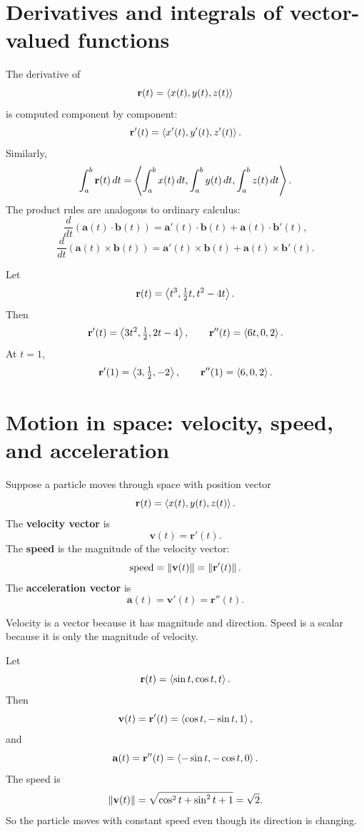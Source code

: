\section{Derivatives and integrals of vector-valued functions}

The derivative of
\[
\mathbf r(t)=\left\langle x(t),y(t),z(t)\right\rangle
\]
is computed component by component:
\[
\mathbf r'(t)=\left\langle x'(t),y'(t),z'(t)\right\rangle.
\]
Similarly,
\[
\int_a^b \mathbf r(t)\,d t
=
\left\langle \int_a^b x(t)\,d t,
\int_a^b y(t)\,d t,
\int_a^b z(t)\,d t\right\rangle.
\]
The product rules are analogous to ordinary calculus:
\[
\frac{d}{dt}\left(\mathbf a(t)\cdot\mathbf b(t)\right)
=\mathbf a'(t)\cdot\mathbf b(t)+\mathbf a(t)\cdot\mathbf b'(t),
\]
\[
\frac{d}{dt}\left(\mathbf a(t)\times\mathbf b(t)\right)
=\mathbf a'(t)\times\mathbf b(t)+\mathbf a(t)\times\mathbf b'(t).
\]

\begin{examplebox}[title={Example 5.6: Differentiate a vector function}]
Let
\[
\mathbf r(t)=\left\langle t^3,\tfrac12 t,t^2-4t\right\rangle.
\]
Then
\[
\mathbf r'(t)=\left\langle 3t^2,\tfrac12,2t-4\right\rangle,
\qquad
\mathbf r''(t)=\left\langle 6t,0,2\right\rangle.
\]
At $t=1$,
\[
\mathbf r'(1)=\left\langle 3,\tfrac12,-2\right\rangle,
\qquad
\mathbf r''(1)=\left\langle 6,0,2\right\rangle.
\]
\end{examplebox}

\section{Motion in space: velocity, speed, and acceleration}

Suppose a particle moves through space with position vector
\[
\mathbf r(t)=\left\langle x(t),y(t),z(t)\right\rangle.
\]
The \textbf{velocity vector} is
\[
\mathbf v(t)=\mathbf r'(t).
\]
The \textbf{speed} is the magnitude of the velocity vector:
\[
\text{speed}=\left\lVert \mathbf v(t)\right\rVert=\left\lVert \mathbf r'(t)\right\rVert.
\]
The \textbf{acceleration vector} is
\[
\mathbf a(t)=\mathbf v'(t)=\mathbf r''(t).
\]

\begin{notebox}[title={Vector versus scalar quantities}]
Velocity is a vector because it has magnitude and direction. Speed is a scalar because it is only the magnitude of velocity.
\end{notebox}

\begin{examplebox}[title={Example 5.7: Motion on a helix}]
Let
\[
\mathbf r(t)=\left\langle \sin t,\cos t,t\right\rangle.
\]
Then
\[
\mathbf v(t)=\mathbf r'(t)=\left\langle \cos t,-\sin t,1\right\rangle,
\]
and
\[
\mathbf a(t)=\mathbf r''(t)=\left\langle -\sin t,-\cos t,0\right\rangle.
\]
The speed is
\[
\left\lVert \mathbf v(t)\right\rVert=\sqrt{\cos^2t+\sin^2t+1}=\sqrt2.
\]
So the particle moves with constant speed even though its direction is changing.
\end{examplebox}

